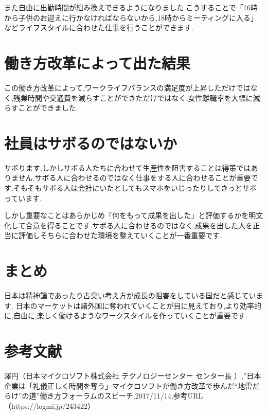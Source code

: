 \documentclass[a4j,10pt]{jsarticle}
\begin{document}
また自由に出勤時間が組み換えできるようになりました.こうすることで「16時から子供のお迎えに行かなければならないから,18時からミーティングに入る」などライフスタイルに合わせた仕事を行うことができます.

\section{働き方改革によって出た結果}
この働き方改革によって,ワークライフバランスの満足度が上昇しただけではなく,残業時間や交通費を減らすことができただけではなく,女性離職率を大幅に減らすことができました.

\section{社員はサボるのではないか}
サボります.しかしサボる人たちに合わせて生産性を阻害することは得策ではありません.サボる人に合わせるのではなく仕事をする人に合わせることが重要です.そもそもサボる人は会社にいたとしてもスマホをいじったりしてきっとサボっています.

しかし重要なことはあらかじめ「何をもって成果を出した」と評価するかを明文化して合意を得ることです.サボる人に合わせるのではなく,成果を出した人を正当に評価しそちらに合わせた環境を整えていくことが一番重要です.
\section{まとめ}
\label{sec:kihon}
日本は精神論であったり古臭い考え方が成長の阻害をしている国だと感じています.
日本のマーケットは諸外国に奪われていくことが目に見えており,より効率的に,自由に,楽しく働けるようなワークスタイルを作っていくことが重要です.

\section{参考文献}
\label{sec:kihon}
 澤円（日本マイクロソフト株式会社 テクノロジーセンター センター長 ）,”日本企業は「礼儀正しく時間を奪う」マイクロソフトが働き方改革で歩んだ“地雷だらけ”の道”働き方フォーラムのスピーチ,2017/11/14,参考URL（https://logmi.jp/243422）
  
\end{document}
